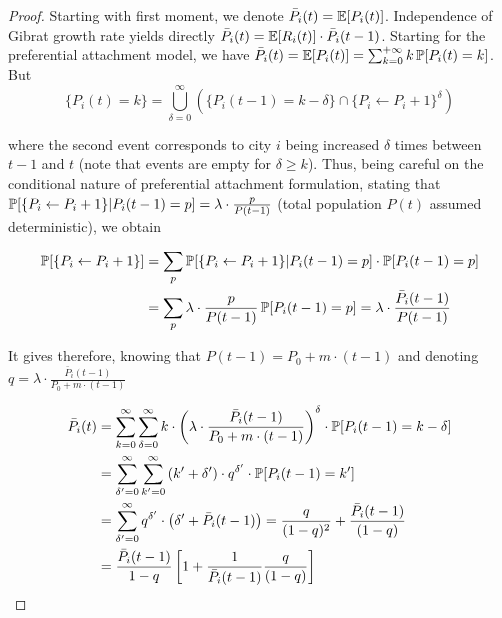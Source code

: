 \begin{proof}

Starting with first moment, we denote $\bar{P}_i(t)=\operatorname{\mathbb{E}}\!\left[P_i(t)\right]$. Independence of Gibrat growth rate yields directly $\bar{P}_i(t)=\operatorname{\mathbb{E}}\!\left[R_i(t)\right]\cdot \bar{P}_i(t-1)$. Starting for the preferential attachment model, we have $\bar{P}_i(t) = \operatorname{\mathbb{E}}\!\left[P_i(t)\right] = \sum_{k=0}^{+\infty}{k\operatorname{\mathbb{P}}\!\left[P_i(t)=k\right]}$. But
\[
\{P_i(t)=k\}=\bigcup_{\delta=0}^{\infty}{\left(\{P_i(t-1)=k-\delta\}\cap \{P_i\leftarrow P_i + 1\}^{\delta}\right)}
\]

where the second event corresponds to city $i$ being increased $\delta$ times between $t-1$ and $t$ (note that events are empty for $\delta \geq k$). Thus, being careful on the conditional nature of preferential attachment formulation, stating that $\operatorname{\mathbb{P}}\!\left[\{P_i\leftarrow P_i + 1\} | P_i(t-1)=p\right] = \lambda\cdot\frac{p}{P(t-1)}$ (total population $P(t)$ assumed deterministic), we obtain

\begin{equation*}
\begin{split}
\operatorname{\mathbb{P}}\!\left[\{P_i\leftarrow P_i + 1\}\right] & = \sum_{p}{\operatorname{\mathbb{P}}\!\left[\{P_i\leftarrow P_i + 1\} | P_i(t-1)=p\right]\cdot \operatorname{\mathbb{P}}\!\left[P_i(t-1)=p\right]}\\
&=\sum_{p}{\lambda\cdot\frac{p}{P(t-1)}\operatorname{\mathbb{P}}\!\left[P_i(t-1)=p\right]}=\lambda\cdot\frac{\bar{P}_i(t-1)}{P(t-1)}\\
\end{split}
\end{equation*}

It gives therefore, knowing that $P(t-1)=P_0 + m\cdot (t-1)$ and denoting $q=\lambda\cdot\frac{\bar{P}_i(t-1)}{P_0 + m\cdot (t-1)}$

\[
\begin{split}
\bar{P}_i(t) & =\sum_{k=0}^{\infty}{\sum_{\delta=0}^{\infty}{k\cdot \left(\lambda\cdot\frac{\bar{P}_i(t-1)}{P_0 + m\cdot (t-1)}\right)^{\delta}\cdot \operatorname{\mathbb{P}}\!\left[P_i(t-1)=k-\delta\right]}}\\
& = \sum_{\delta^{\prime}=0}^{\infty}{\sum_{k^{\prime}=0}^{\infty}{\left(k^\prime + \delta^{\prime}\right)\cdot q^{\delta^{\prime}} \cdot \operatorname{\mathbb{P}}\!\left[P_i(t-1)=k^\prime\right]}}\\
& = \sum_{\delta^{\prime}=0}^{\infty}{q^{\delta^{\prime}}\cdot \left(\delta^{\prime} + \bar{P}_i(t-1)\right)} = \frac{q}{(1-q)^2} + \frac{\bar{P}_i(t-1)}{(1-q)}\\
& = \frac{\bar{P}_i(t-1)}{1-q}\left[1 + \frac{1}{\bar{P}_i(t-1)}\frac{q}{(1-q)}\right]
\end{split}
\]




\end{proof}
